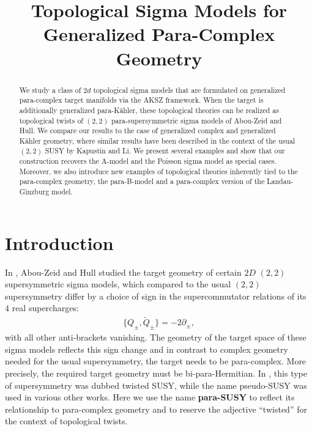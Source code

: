 \documentclass[letterpaper,12pt]{article}
\title{Topological Sigma Models for Generalized Para-Complex Geometry}
\newcommand{\p}{\partial}
\def\tl{\tilde}
\theoremstyle{definition}
\theoremstyle{remark}
\theoremstyle{examples}
\begin{document}
\maketitle
\begin{abstract}
We study a class of $2d$ topological sigma models that are formulated on generalized para-complex target manifolds via the AKSZ framework. When the target is additionally generalized para-K\"ahler, these topological theories can be realized as topological twists of $(2,2)$ para-supersymmetric sigma models of Abou-Zeid and Hull. We compare our results to the case of generalized complex and generalized K\"ahler geometry, where similar results have been described in the context of the usual $(2,2)$ SUSY by Kapustin and Li. We present several examples and show that our construction recovers the A-model and the Poisson sigma model as special cases. Moreover, we also introduce new examples of topological theories inherently tied to the para-complex geometry, the para-B-model and a para-complex version of the Landau-Ginzburg model.


\end{abstract}
\newpage
\tableofcontents
\newpage
\section{Introduction}

In \cite{HullTwistedSUSY}, Abou-Zeid and Hull studied the target geometry of certain $2D$ $(2,2)$ supersymmetric sigma models, which compared to the usual $(2,2)$ supersymmetry differ by a choice of sign in the supercommutator relations of its $4$ real supercharges:
\begin{align*}
\{Q_\pm,\tl{Q}_\pm\}=-2\p_\pm,
\end{align*}
with all other anti-brackets vanishing. The geometry of the target space of these sigma models reflects this sign change and in contrast to complex geometry needed for the usual supersymmetry, the target needs to be para-complex. More precisely, the required target geometry must be bi-para-Hermitian. In \cite{HullTwistedSUSY}, this type of supersymmetry was dubbed {twisted} SUSY, while the name {pseudo}-SUSY was used in various other works. Here we use the name {\bf para-SUSY} to reflect its relationship to para-complex geometry and to reserve the adjective ``twisted'' for the context of topological twists.
\end{document}
